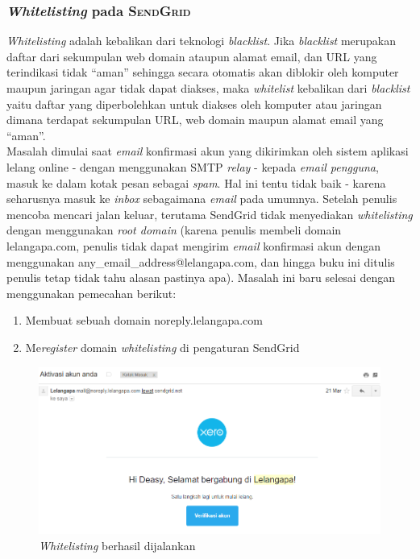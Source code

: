 \subsubsection{\textit{Whitelisting} pada \textsc{SendGrid}}
	\textit{Whitelisting} adalah kebalikan dari teknologi \textit{blacklist}. Jika \textit{blacklist} merupakan daftar dari sekumpulan web domain ataupun alamat email, dan URL yang terindikasi tidak “aman” sehingga secara otomatis akan diblokir oleh komputer maupun jaringan agar tidak dapat diakses, maka \textit{whitelist} kebalikan dari \textit{blacklist} yaitu daftar yang diperbolehkan untuk diakses oleh komputer atau jaringan dimana terdapat sekumpulan URL, web domain maupun alamat email yang “aman”.\\
	\indent Masalah dimulai saat \textit{email} konfirmasi akun yang dikirimkan oleh sistem aplikasi lelang online - dengan menggunakan SMTP \textit{relay} - kepada \textit{email pengguna}, masuk ke dalam kotak pesan sebagai \textit{spam}. Hal ini tentu tidak baik - karena seharusnya masuk ke \textit{inbox} sebagaimana \textit{email} pada umumnya. Setelah penulis mencoba mencari jalan keluar, terutama SendGrid tidak menyediakan \textit{whitelisting} dengan menggunakan \textit{root domain} (karena penulis membeli domain lelangapa.com, penulis tidak dapat mengirim \textit{email} konfirmasi akun dengan menggunakan any\_email\_address@lelangapa.com, dan hingga buku ini ditulis penulis tetap tidak tahu alasan pastinya apa). Masalah ini baru selesai dengan menggunakan pemecahan berikut:
	\begin{enumerate}
		\item Membuat sebuah domain noreply.lelangapa.com
		\item Me\textit{register} domain \textit{whitelisting} di pengaturan SendGrid
	\end{enumerate}
	
	\begin{figure}[H]
		\centering
		\includegraphics[width=\textwidth]{images/bab4/pl/whitelist-success.png}
		\caption{\textit{Whitelisting} berhasil dijalankan}
		\label{whitelist-success}
	\end{figure}
	
